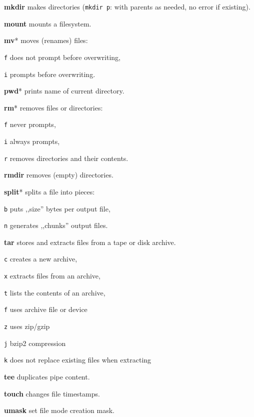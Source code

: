 \manualbreak

\textbf{mkdir} makes directories (\texttt{mkdir p}: with parents as needed, no
error if existing).

\textbf{mount} mounts a filesystem.

\textbf{mv}* moves (renames) files:
\begin{enumx}
	\item [\texttt{f}] does not prompt before overwriting,
	\item [\texttt{i}] prompts before overwriting.
\end{enumx}

\textbf{pwd}* prints name of current directory.

\textbf{rm}* removes files or directories:
\begin{enumx}
	\item [\texttt{f}] never prompts,
	\item [\texttt{i}] always prompts,
	\item [\texttt{r}] removes directories and their contents.
\end{enumx}

\textbf{rmdir} removes (empty) directories.

\textbf{split}* splits a file into pieces:
\begin{enumx}
	\item [\texttt{b}] puts ,,size'' bytes per output file,
	\item [\texttt{n}] generates ,,chunks'' output files.
\end{enumx}

\textbf{tar} stores and extracts files from a tape or disk archive.
\begin{enumx}
	\item [\texttt{c}] creates a new archive,
	\item [\texttt{x}] extracts files from an archive,
	\item [\texttt{t}] lists the contents of an archive,
	\item [\texttt{f}] uses archive file or device
	\item [\texttt{z}] uses zip/gzip
	\item [\texttt{j}] bzip2 compression
	\item [\texttt{k}] does not replace existing files when extracting
\end{enumx}

\textbf{tee} duplicates pipe content.

\textbf{touch} changes file timestamps.


\textbf{umask} set file mode creation mask.
 